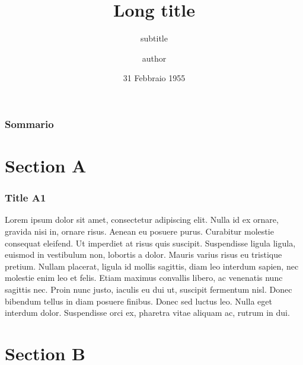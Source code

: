 \documentclass[c]{beamer}
\title[Short title]{Long title}
\subtitle{subtitle}
\author[author]{author}
\date[31/04/1995]{31 Febbraio 1955}
\begin{document}

\polimititlepage %
\polimititlepage[polimi]
\polimititlepage[airlab]
\polimititlepage[necst]

\addtocounter{framenumber}{-3}


\begin{frame}
\frametitle{Sommario}
\tableofcontents
\end{frame}

\section{Section A}

\begin{frame}
\frametitle{Title A1}

Lorem ipsum dolor sit amet, consectetur adipiscing elit. Nulla id ex ornare, gravida nisi in, ornare risus. Aenean eu posuere purus. Curabitur molestie consequat eleifend. Ut imperdiet at risus quis suscipit. Suspendisse ligula ligula, euismod in vestibulum non, lobortis a dolor. Mauris varius risus eu tristique pretium. Nullam placerat, ligula id mollis sagittis, diam leo interdum sapien, nec molestie enim leo et felis. Etiam maximus convallis libero, ac venenatis nunc sagittis nec. Proin nunc justo, iaculis eu dui ut, suscipit fermentum nisl. Donec bibendum tellus in diam posuere finibus. Donec sed luctus leo. Nulla eget interdum dolor. Suspendisse orci ex, pharetra vitae aliquam ac, rutrum in dui.

\end{frame}

\section{Section B}
\end{document}
